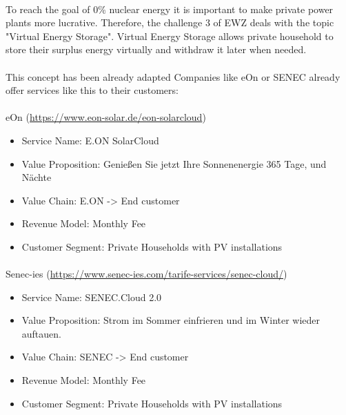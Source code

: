 \documentclass{scrartcl}
\begin{document}
	\paragraph{}
	To reach the goal of 0\% nuclear energy it is important to make private power plants more lucrative. Therefore, the challenge 3 of EWZ deals with the topic "Virtual Energy Storage". Virtual Energy Storage allows private household to store their surplus energy virtually and withdraw it later when needed.
	
	\paragraph{}
	This concept has been already adapted   Companies like eOn or SENEC already offer services like this to their customers:
	
	\paragraph{}
	eOn (\url{https://www.eon-solar.de/eon-solarcloud})
	
	\begin{itemize}
		\item Service Name:	E.ON SolarCloud
		\item Value Proposition: Genießen Sie jetzt Ihre Sonnenenergie 365 Tage, und Nächte
		\item Value Chain: E.ON -> End customer
		\item Revenue Model: Monthly Fee
		\item Customer Segment: Private Households with PV installations
	\end{itemize}
	
	\paragraph{}
	Senec-ies (\url{https://www.senec-ies.com/tarife-services/senec-cloud/})
	
	\begin{itemize}
		\item Service Name: SENEC.Cloud 2.0
		\item Value Proposition: Strom im Sommer einfrieren und im Winter wieder auftauen.
		\item Value Chain: SENEC -> End customer
		\item Revenue Model: Monthly Fee
		\item Customer Segment:	Private Households with PV installations
	\end{itemize}
\end{document}
